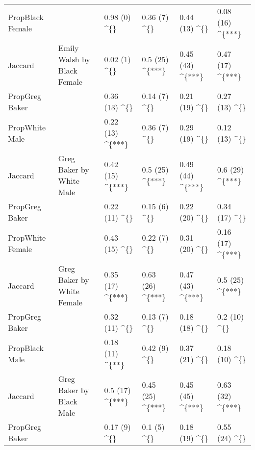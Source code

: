 \begin{table}
\begin{tabular}{llllll}
PropBlack Female &  & 0.98 (0) \textasciicircum{}\{\} & 0.36 (7) \textasciicircum{}\{\} & 0.44 (13) \textasciicircum{}\{\} & 0.08 (16) \textasciicircum{}\{***\}\\

Jaccard & \multirow{-3}{*}{\raggedright\arraybackslash Emily Walsh by Black Female} & 0.02 (1) \textasciicircum{}\{\} & 0.5 (25) \textasciicircum{}\{***\} & 0.45 (43) \textasciicircum{}\{***\} & 0.47 (17) \textasciicircum{}\{***\}\\
\cmidrule{1-6}
PropGreg Baker &  & 0.36 (13) \textasciicircum{}\{\} & 0.14 (7) \textasciicircum{}\{\} & 0.21 (19) \textasciicircum{}\{\} & 0.27 (13) \textasciicircum{}\{\}\\

PropWhite Male &  & 0.22 (13) \textasciicircum{}\{***\} & 0.36 (7) \textasciicircum{}\{\} & 0.29 (19) \textasciicircum{}\{\} & 0.12 (13) \textasciicircum{}\{\}\\

Jaccard & \multirow{-3}{*}{\raggedright\arraybackslash Greg Baker by White Male} & 0.42 (15) \textasciicircum{}\{***\} & 0.5 (25) \textasciicircum{}\{***\} & 0.49 (44) \textasciicircum{}\{***\} & 0.6 (29) \textasciicircum{}\{***\}\\
\cmidrule{1-6}
PropGreg Baker &  & 0.22 (11) \textasciicircum{}\{\} & 0.15 (6) \textasciicircum{}\{\} & 0.22 (20) \textasciicircum{}\{\} & 0.34 (17) \textasciicircum{}\{\}\\

PropWhite Female &  & 0.43 (15) \textasciicircum{}\{\} & 0.22 (7) \textasciicircum{}\{\} & 0.31 (20) \textasciicircum{}\{\} & 0.16 (17) \textasciicircum{}\{***\}\\

Jaccard & \multirow{-3}{*}{\raggedright\arraybackslash Greg Baker by White Female} & 0.35 (17) \textasciicircum{}\{***\} & 0.63 (26) \textasciicircum{}\{***\} & 0.47 (43) \textasciicircum{}\{***\} & 0.5 (25) \textasciicircum{}\{***\}\\
\cmidrule{1-6}
PropGreg Baker &  & 0.32 (11) \textasciicircum{}\{\} & 0.13 (7) \textasciicircum{}\{\} & 0.18 (18) \textasciicircum{}\{\} & 0.2 (10) \textasciicircum{}\{\}\\

PropBlack Male &  & 0.18 (11) \textasciicircum{}\{**\} & 0.42 (9) \textasciicircum{}\{\} & 0.37 (21) \textasciicircum{}\{\} & 0.18 (10) \textasciicircum{}\{\}\\

Jaccard & \multirow{-3}{*}{\raggedright\arraybackslash Greg Baker by Black Male} & 0.5 (17) \textasciicircum{}\{***\} & 0.45 (25) \textasciicircum{}\{***\} & 0.45 (45) \textasciicircum{}\{***\} & 0.63 (32) \textasciicircum{}\{***\}\\
\cmidrule{1-6}
PropGreg Baker &  & 0.17 (9) \textasciicircum{}\{\} & 0.1 (5) \textasciicircum{}\{\} & 0.18 (19) \textasciicircum{}\{\} & 0.55 (24) \textasciicircum{}\{\}\\


\end{tabular}
\end{table}
